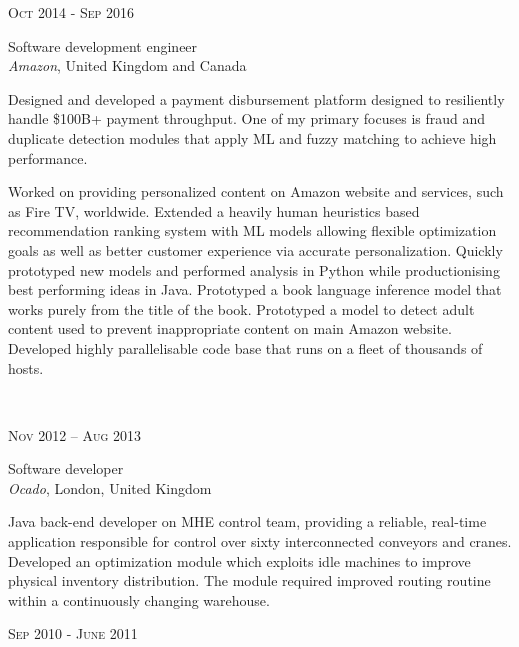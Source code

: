 \documentclass[10pt]{article} %
\begin{document}
{\begin{minipage}[t]{0.58\textwidth}
{\raggedleft\textsc{Oct 2014 - Sep 2016}\par}

{\raggedright\large Software development engineer\\
\textit{Amazon}, United Kingdom and Canada\\[5pt]}

\normalsize{Designed and developed a payment disbursement 
platform designed to resiliently handle \$100B+ payment throughput. 
One of my primary focuses is fraud and duplicate detection modules that apply ML and fuzzy matching to achieve high performance.

Worked on providing personalized content on Amazon website and services, such as Fire TV, worldwide.
Extended a heavily human heuristics based recommendation
ranking system with ML models allowing flexible
optimization goals as well as better customer experience via accurate personalization.
Quickly prototyped new models and performed analysis in Python
while productionising best performing ideas in Java.
Prototyped a book language inference model that works purely from the title of the book.
Prototyped a model to detect adult content used to prevent inappropriate content on main Amazon website.
Developed highly parallelisable code base that runs on a fleet of thousands of hosts.}\\


{\raggedleft\textsc{Nov 2012 – Aug 2013}\par}

{\raggedright\large Software developer\\
\textit{Ocado}, London, United Kingdom\\[5pt]}

\normalsize{Java back-end developer on MHE control team,
providing a reliable, real-time application responsible for
control over sixty interconnected conveyors and cranes.
Developed an optimization module which exploits idle machines
to improve physical inventory distribution.
The module required improved routing routine within a continuously changing warehouse.}\\


{\raggedleft\textsc{Sep 2010 - June 2011}\par}


\end{minipage}}
\end{document}
